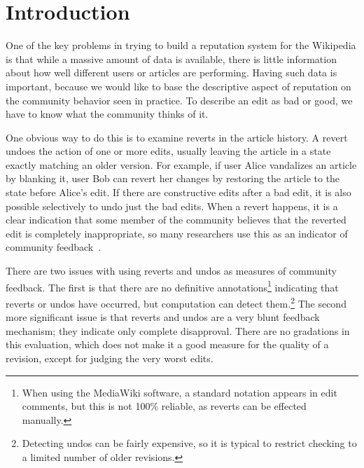 \section{Introduction}

One of the key problems in trying to build a reputation system
for the Wikipedia is that while a massive amount of
data is available, there is little information about how well different
users or articles are performing.
Having such data is important, because we would like to base the
descriptive aspect of reputation on the community behavior seen
in practice.
To describe an edit as bad or good, we have to know what the
community thinks of it.

One obvious way to do this is to examine reverts
in the article history.
A revert undoes the action of one or more edits, usually leaving
the article in a state exactly matching an older version.
For example, if user Alice vandalizes an article by blanking it,
user Bob can revert her changes by restoring the article to the
state before Alice's edit.
If there are constructive edits after a bad edit, it is also possible
selectively to undo just the bad edits.
When a revert happens, it is a clear indication that some member
of the community believes that the reverted edit is completely
inappropriate, so many researchers use this as an indicator of
community feedback~\cite{Adler2007,Smets2008,Itakura2009,Belani2010}.

There are two issues with using reverts and undos
as measures of community feedback.
The first is that there are no definitive
annotations\footnote{When using the MediaWiki software,
a standard notation appears in edit comments,
but this is not 100\% reliable, as reverts can be effected manually.}
indicating that reverts or undos have occurred,
but computation can detect
them.\footnote{Detecting undos can be fairly expensive, so
it is typical to restrict checking to a limited number of older revisions.}
The second more significant issue is that reverts and undos
are a very blunt feedback mechanism; they indicate only complete disapproval.
There are no gradations in this evaluation, which does not make
it a good measure for the quality of a revision, except for judging the very
worst edits.

